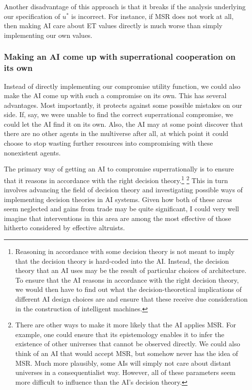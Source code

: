Another disadvantage of this approach is that it breaks if the analysis
underlying our specification of \(u^{*}\) is incorrect. For instance, if
MSR does not work at all, then making AI care about ET values directly
is much worse than simply implementing our own values.

\hypertarget{making-an-ai-come-up-with-superrational-cooperation-on-its-own}{\subsubsection{Making
an AI come up with superrational cooperation on its
own}\label{making-an-ai-come-up-with-superrational-cooperation-on-its-own}}

Instead of directly implementing our compromise utility function, we
could also make the AI come up with such a compromise on its own. This
has several advantages. Most importantly, it protects against some
possible mistakes on our side. If, say, we were unable to find the
correct superrational compromise, we could let the AI find it on its
own. Also, the AI may at some point discover that there are no other
agents in the multiverse after all, at which point it could choose to
stop wasting further resources into compromising with these nonexistent
agents.

The primary way of getting an AI to compromise superrationally is to
ensure that it reasons in accordance with the right decision
theory.\footnote{Reasoning in accordance with some decision theory is
  not meant to imply that the decision theory is hard-coded into the AI.
  Instead, the decision theory that an AI uses may be the result of
  particular choices of architecture. To ensure that the AI reasons in
  accordance with the right decision theory, we would then have to find
  out what the decision-theoretical implications of different AI design
  choices are and ensure that these receive due consideration in the
  construction of intelligent machines.} \footnote{There are other ways
  to make it more likely that the AI applies MSR. For example, one could
  ensure that its epistemology enables it to infer the existence of
  other universes that cannot be observed directly. We could also think
  of an AI that would accept MSR, but somehow never has the idea of MSR.
  Much more plausibly, some AIs will simply not care about distant
  universes in a consequentialist way. However, all of these parameters
  seem more difficult to influence than the AI's decision theory.} This
in turn involves advancing the field of decision theory and
investigating possible ways of implementing decision theories in AI
systems. Given how both of these areas seem neglected and gains from
trade may be quite significant, I could very well imagine that
interventions in this area are among the most effective of those
hitherto considered by effective altruists.

